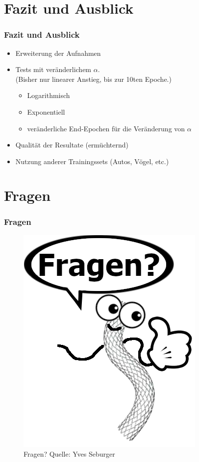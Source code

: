 \documentclass{beamer}
\begin{document}
\section{Fazit und Ausblick}
\begin{frame}
\frametitle{Fazit und Ausblick}
\begin{itemize}
    \item Erweiterung der Aufnahmen
    \item Tests mit veränderlichem $\alpha$. \\
    \small{(Bisher nur linearer Anstieg, bis zur 10ten Epoche.)}
    \begin{itemize}
        \item Logarithmisch
        \item Exponentiell
        \item veränderliche End-Epochen für die Veränderung von $\alpha$
    \end{itemize}
    \item Qualität der Resultate (ermüchternd)
    \item Nutzung anderer Trainingssets (Autos, Vögel, etc.)
\end{itemize}
\end{frame}

\section{Fragen}
\begin{frame}
\frametitle{Fragen}
\begin{figure}
    \includegraphics[width=0.5\linewidth]{Bilder/Happy STent.png}
    \caption{Fragen? \scriptsize{Quelle: Yves Seburger}}
\end{figure}
\end{frame}
\end{document}
